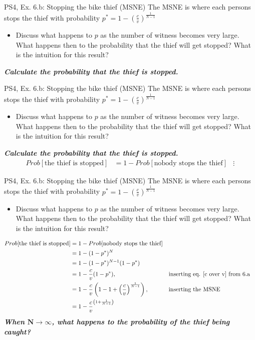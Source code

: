 \begin{frame}{PS4, Ex. 6.b: Stopping the bike thief (MSNE)}
    The MSNE is where each persons stops the thief with probability $p^{*}=1-\left(\frac{c}{v}\right)^{\frac{1}{N-1}}$
    \begin{itemize}
      \item[b)] Discuss what happens to $p$ as the number of witness becomes very large. What happens then to the probability that the thief will get stopped? What is the intuition for this result?
    \end{itemize}
    \textbf{\textit{Calculate the probability that the thief is stopped.}}
  \vfill\null
\end{frame}
\begin{frame}{PS4, Ex. 6.b: Stopping the bike thief (MSNE)}
    The MSNE is where each persons stops the thief with probability $p^{*}=1-\left(\frac{c}{v}\right)^{\frac{1}{N-1}}$
    \begin{itemize}
      \item[b)] Discuss what happens to $p$ as the number of witness becomes very large. What happens then to the probability that the thief will get stopped? What is the intuition for this result?
    \end{itemize}
    \textbf{\textit{Calculate the probability that the thief is stopped.}}
    \begin{align*}
        Prob[\text{the thief is stopped}]&=1-Prob[\text{nobody stops the thief}]
        &\vdots
    \end{align*}
  \vfill\null
\end{frame}
\begin{frame}{PS4, Ex. 6.b: Stopping the bike thief (MSNE)}
    The MSNE is where each persons stops the thief with probability $p^{*}=1-\left(\frac{c}{v}\right)^{\frac{1}{N-1}}$
    \begin{itemize}
      \item[b)] Discuss what happens to $p$ as the number of witness becomes very large. What happens then to the probability that the thief will get stopped? What is the intuition for this result?
    \end{itemize}
    \vspace{-10pt}
    \begin{align*}
        Prob[\text{the thief is stopped}]&=1-Prob[\text{nobody stops the thief}]\\
            &=1-(1-p^{*})^{N}\\
            &=1-(1-p^{*})^{N-1}(1-p^{*})\\
            &=1-\frac{c}{v}(1-p^{*}),&&\text{inserting eq. \eqref{c over v} from 6.a}\\
            &=1-\frac{c}{v}\left(1-1+\left(\frac{c}{v}\right)^{\frac{1}{N-1}}\right),&&\text{inserting the MSNE}\\
            &=1-\frac{c}{v}^{\left(1+\frac{1}{N-1}\right)}
    \end{align*}
    \textbf{\textit{When $\bm{N\rightarrow\infty}$, what happens to the probability of the thief being caught?}}
  \vfill\null
\end{frame}

